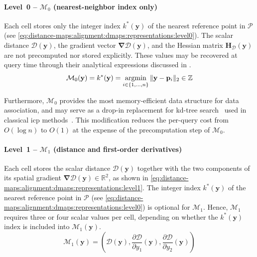 \paragraph{Level~0 -- $\mathcal{M}_0$ (nearest-neighbor index only)}
Each cell stores only the integer index $k^*(\mathbf{y})$ of the
nearest reference point in $\mathcal{P}$
(see \eqref{eq:distance-maps:alignment:dmaps:representations:level0}).
The scalar distance $\mathcal{D}(\mathbf{y})$, the gradient vector
$\bm{\nabla}\mathcal{D}(\mathbf{y})$, and the Hessian matrix
$\mathbf{H}_{\mathcal{D}}(\mathbf{y})$ are not precomputed nor stored explicitly.
These values may be recovered at query time through their analytical expressions
discussed in .
\begin{equation}
\label{eq:distance-maps:alignment:dmaps:representations:level0}
\mathcal{M}_0(\mathbf{y}) = k^*(\mathbf{y})
= \operatorname*{argmin}_{i \in \{1,\dots,n\}}
\|\mathbf{y} - \mathbf{p}_i\|_2 \in \mathbb{Z}
\end{equation}

Furthermore, $\mathcal{M}_0$ provides the most memory-efficient data
structure for data association, and may serve as a drop-in replacement
for kd-tree search~\cite{bentley:cacm:1975}
used in classical \gls{icp} methods~\cite{besl-mckay:tpami:1992,
chen-medioni:icra:1991}. This modification reduces the per-query cost from
$O(\log n)$ to $O(1)$ at the expense of
the precomputation step of $\mathcal{M}_0$.

\paragraph{Level~1 -- $\mathcal{M}_1$ (distance and first-order derivatives)}
Each cell stores the scalar distance $\mathcal{D}(\mathbf{y})$ together
with the two components of its spatial gradient
$\bm{\nabla}\mathcal{D}(\mathbf{y}) \in \mathbb{R}^2$, as shown in
\eqref{eq:distance-maps:alignment:dmaps:representations:level1}.
The integer index $k^*(\mathbf{y})$ of the nearest reference point in
$\mathcal{P}$
(see \eqref{eq:distance-maps:alignment:dmaps:representations:level0})
is optional for $\mathcal{M}_1$.
Hence, $\mathcal{M}_1$ requires three or four scalar values
per cell, depending on whether the $k^*(\mathbf{y})$ index is included into
$\mathcal{M}_1(\mathbf{y})$.
\begin{equation}
\label{eq:distance-maps:alignment:dmaps:representations:level1}
\mathcal{M}_1(\mathbf{y}) =
\left(
    \mathcal{D}(\mathbf{y}),
    \frac{\partial \mathcal{D}}{\partial y_1}(\mathbf{y}),
    \frac{\partial \mathcal{D}}{\partial y_2}(\mathbf{y})
\right)
\end{equation}

